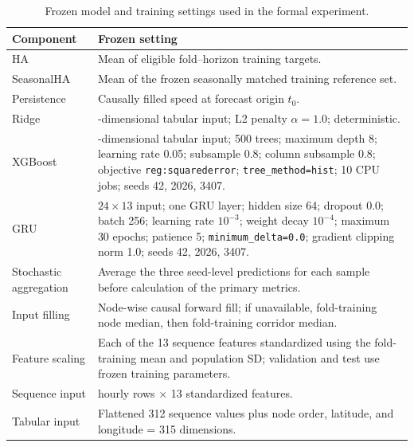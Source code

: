 \begin{table}[!htbp]
\centering
\caption{Frozen model and training settings used in the formal experiment.}
\label{tab:appendix_hyperparameters}
\footnotesize
\begin{tabularx}{\textwidth}{|>{\raggedright\arraybackslash}p{}|>{\raggedright\arraybackslash}X|}
\hline
\textbf{Component} & \textbf{Frozen setting} \\
\hline
HA & Mean of eligible fold--horizon training targets. \\ 
\hline
SeasonalHA & Mean of the frozen seasonally matched training reference set. \\ 
\hline
Persistence & Causally filled speed at forecast origin $t_0$. \\ 
\hline
Ridge & 315-dimensional tabular input; L2 penalty $\alpha=1.0$; deterministic. \\ 
\hline
XGBoost & 315-dimensional tabular input; 500 trees; maximum depth 8; learning rate 0.05; subsample 0.8; column subsample 0.8; objective \texttt{reg:squarederror}; \texttt{tree\_method=hist}; 10 CPU jobs; seeds 42, 2026, 3407. \\ 
\hline
GRU & $24\times13$ input; one GRU layer; hidden size 64; dropout 0.0; batch 256; learning rate $10^{-3}$; weight decay $10^{-4}$; maximum 30 epochs; patience 5; \texttt{minimum\_delta=0.0}; gradient clipping norm 1.0; seeds 42, 2026, 3407. \\ 
\hline
Stochastic aggregation & Average the three seed-level predictions for each sample before calculation of the primary metrics. \\ 
\hline
Input filling & Node-wise causal forward fill; if unavailable, fold-training node median, then fold-training corridor median. \\ 
\hline
Feature scaling & Each of the 13 sequence features standardized using the fold-training mean and population SD; validation and test use frozen training parameters. \\ 
\hline
Sequence input & 24 hourly rows $\times$ 13 standardized features. \\ 
\hline
Tabular input & Flattened 312 sequence values plus node order, latitude, and longitude = 315 dimensions. \\
\hline
\end{tabularx}
\end{table}
